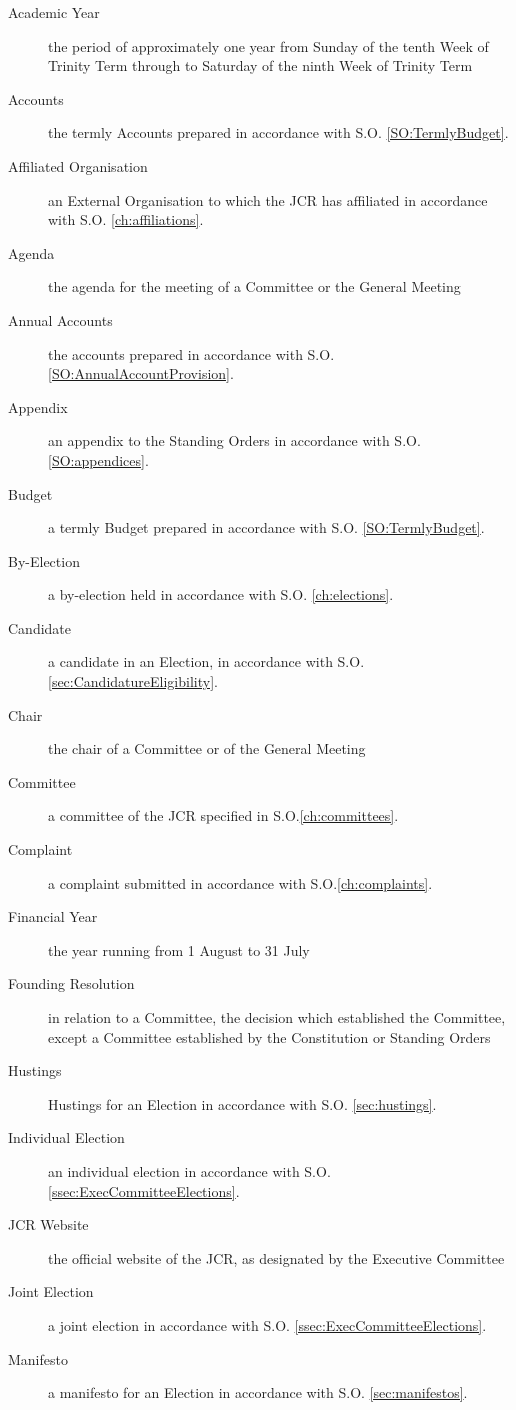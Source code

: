 \begin{description}
\item[Academic Year] the period of approximately one year from Sunday of the tenth Week of Trinity Term through to Saturday of the ninth Week of Trinity Term 
\item[Accounts] the termly Accounts prepared in accordance with S.O. \ref{SO:TermlyBudget}.
\item[Affiliated Organisation] an External Organisation to which the JCR has affiliated in accordance with S.O. \ref{ch:affiliations}.
\item[Agenda] the agenda for the meeting of a Committee or the General Meeting
\item[Annual Accounts] the accounts prepared in accordance with S.O. \ref{SO:AnnualAccountProvision}.
\item[Appendix] an appendix to the Standing Orders in accordance with S.O. \ref{SO:appendices}.
\item[Budget] a termly Budget prepared in accordance with S.O. \ref{SO:TermlyBudget}.
\item[By-Election] a by-election held in accordance with S.O. \ref{ch:elections}.
\item[Candidate] a candidate in an Election, in accordance with S.O. \ref{sec:CandidatureEligibility}.
\item[Chair] the chair of a Committee or of the General Meeting
\item[Committee] a committee of the JCR specified in S.O.\ref{ch:committees}.
\item[Complaint] a complaint submitted in accordance with S.O.\ref{ch:complaints}.
\item[Financial Year] the year running from 1 August to 31 July
\item[Founding Resolution] in relation to a Committee, the decision which established the Committee, except a Committee established by the Constitution or Standing Orders
\item[Hustings] Hustings for an Election in accordance with S.O. \ref{sec:hustings}.
\item[Individual Election] an individual election in accordance with S.O. \ref{ssec:ExecCommitteeElections}.
\item[JCR Website] the official website of the JCR, as designated by the Executive Committee
\item[Joint Election] a joint election in accordance with S.O. \ref{ssec:ExecCommitteeElections}.
\item[Manifesto] a manifesto for an Election in accordance with S.O. \ref{sec:manifestos}.

\end{description}
